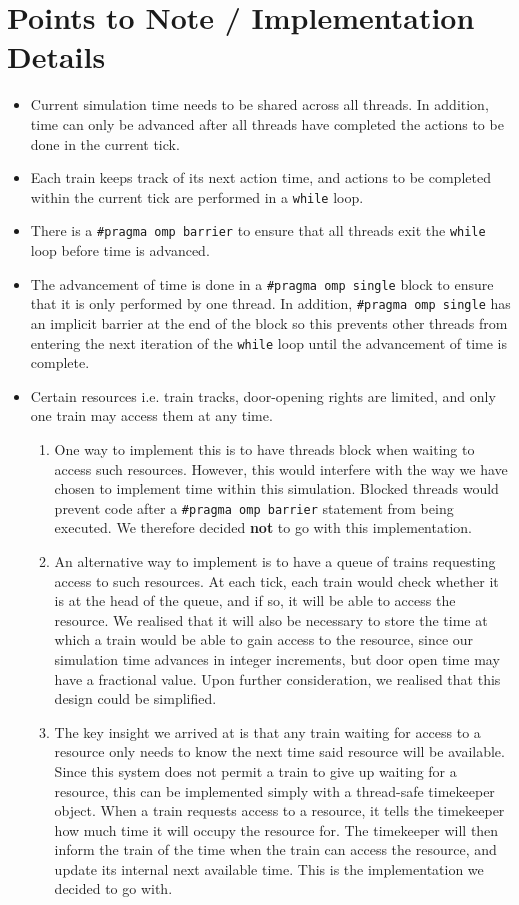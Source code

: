 \documentclass[a4paper,12pt]{article}
\begin{document}
	\section{Points to Note / Implementation Details}
	\begin{itemize}
		\item Current simulation time needs to be shared across all threads. In addition, time can only be advanced after all threads have completed the actions to be done in the current tick.
		\item Each train keeps track of its next action time, and actions to be completed within the current tick are performed in a \texttt{while} loop.
		\item There is a \texttt{#pragma omp barrier} to ensure that all threads exit the \texttt{while} loop before time is advanced.
		\item The advancement of time is done in a \texttt{#pragma omp single} block to ensure that it is only performed by one thread. In addition, \texttt{#pragma omp single} has an implicit barrier at the end of the block so this prevents other threads from entering the next iteration of the \texttt{while} loop until the advancement of time is complete.
		\item Certain resources i.e. train tracks, door-opening rights are limited, and only one train may access them at any time.
		\begin{enumerate}
			\item One way to implement this is to have threads block when waiting to access such resources. However, this would interfere with the way we have chosen to implement time within this simulation. Blocked threads would prevent code after a \texttt{#pragma omp barrier} statement from being executed. We therefore decided \textbf{not} to go with this implementation.
			\item An alternative way to implement is to have a queue of trains requesting access to such resources. At each tick, each train would check whether it is at the head of the queue, and if so, it will be able to access the resource. We realised that it will also be necessary to store the time at which a train would be able to gain access to the resource, since our simulation time advances in integer increments, but door open time may have a fractional value. Upon further consideration, we realised that this design could be simplified.
			\item The key insight we arrived at is that any train waiting for access to a resource only needs to know the next time said resource will be available. Since this system does not permit a train to give up waiting for a resource, this can be implemented simply with a thread-safe timekeeper object. When a train requests access to a resource, it tells the timekeeper how much time it will occupy the resource for. The timekeeper will then inform the train of the time when the train can access the resource, and update its internal next available time. This is the implementation we decided to go with.

\end{enumerate}
\end{itemize}
\end{document}
